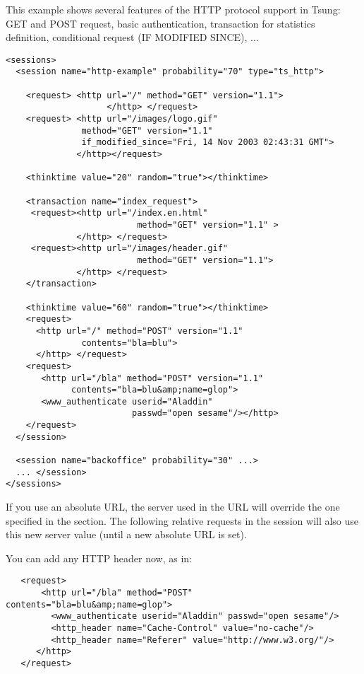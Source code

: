 \documentclass{TSUNG-en}
\begin{document}
This example shows several features of the HTTP protocol support in
Tsung: GET and POST request, basic authentication, transaction for
statistics definition, conditional request (IF MODIFIED SINCE), ...


\begin{Verbatim}
<sessions>
  <session name="http-example" probability="70" type="ts_http">

    <request> <http url="/" method="GET" version="1.1">
                    </http> </request>
    <request> <http url="/images/logo.gif"
               method="GET" version="1.1"
               if_modified_since="Fri, 14 Nov 2003 02:43:31 GMT">
              </http></request>

    <thinktime value="20" random="true"></thinktime>

    <transaction name="index_request">
     <request><http url="/index.en.html"
                          method="GET" version="1.1" >
              </http> </request>
     <request><http url="/images/header.gif"
                          method="GET" version="1.1">
              </http> </request>
    </transaction>

    <thinktime value="60" random="true"></thinktime>
    <request>
      <http url="/" method="POST" version="1.1"
               contents="bla=blu">
      </http> </request>
    <request>
       <http url="/bla" method="POST" version="1.1"
             contents="bla=blu&amp;name=glop">
       <www_authenticate userid="Aladdin"
                         passwd="open sesame"/></http>
    </request>
  </session>

  <session name="backoffice" probability="30" ...>
  ... </session>
</sessions>
\end{Verbatim}


If you use an absolute URL, the server used in the URL will override
the one specified in the  section. The following relative
requests in the session will also use this new server value (until a
new absolute URL is set).

 You can add any HTTP header now, as in:
\begin{Verbatim}
   <request>
       <http url="/bla" method="POST" contents="bla=blu&amp;name=glop">
         <www_authenticate userid="Aladdin" passwd="open sesame"/>
         <http_header name="Cache-Control" value="no-cache"/>
         <http_header name="Referer" value="http://www.w3.org/"/>
      </http>
   </request>
\end{Verbatim}
\end{document}
